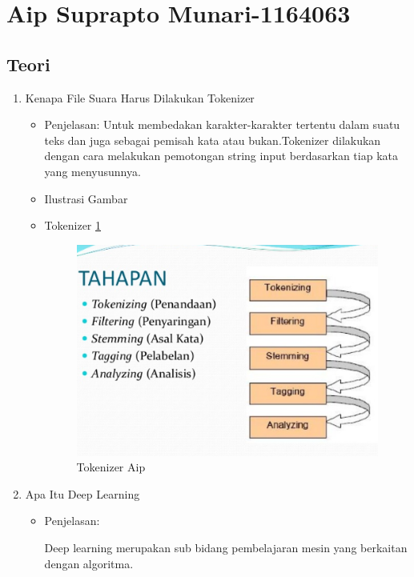 \section{Aip Suprapto Munari-1164063}
\subsection{Teori}
\begin{enumerate}
\item Kenapa File Suara Harus Dilakukan Tokenizer
\begin{itemize}
\item Penjelasan: Untuk membedakan karakter-karakter tertentu dalam suatu teks dan juga sebagai pemisah kata atau bukan.Tokenizer dilakukan dengan cara melakukan pemotongan string input berdasarkan tiap kata yang menyusunnya.
\par 
\par
\item Ilustrasi Gambar
\item Tokenizer \ref{teori1}
\begin{figure}[!hbtp]
\centering
\includegraphics[scale=0.7]{figures/AIP/g1.PNG}
\caption{Tokenizer Aip}
\label{teori1}
\end{figure}
\par
\end{itemize}
\par
\par

\item Apa Itu Deep Learning
\begin{itemize}
\item Penjelasan: 
\par  Deep learning merupakan sub bidang pembelajaran mesin yang berkaitan dengan algoritma.
\end{itemize}
\par
\par


\end{enumerate}
